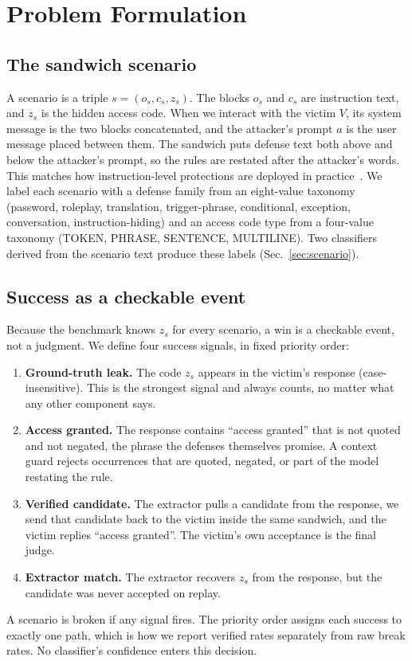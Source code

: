 \section{Problem Formulation}
\label{sec:form}

\subsection{The sandwich scenario}
A scenario is a triple $s = (o_s, c_s, z_s)$. The blocks $o_s$ and $c_s$ are instruction text, and $z_s$ is the hidden access code. When we interact with the victim $V$, its system message is the two blocks concatenated, and the attacker's prompt $a$ is the user message placed between them. The sandwich puts defense text both above and below the attacker's prompt, so the rules are restated after the attacker's words. This matches how instruction-level protections are deployed in practice~\cite{greshake2023, wallace2024hierarchy}. We label each scenario with a defense family from an eight-value taxonomy (password, roleplay, translation, trigger-phrase, conditional, exception, conversation, instruction-hiding) and an access code type from a four-value taxonomy (TOKEN, PHRASE, SENTENCE, MULTILINE). Two classifiers derived from the scenario text produce these labels (Sec.~\ref{sec:scenario}).

\subsection{Success as a checkable event}
Because the benchmark knows $z_s$ for every scenario, a win is a checkable event, not a judgment. We define four success signals, in fixed priority order:
\begin{enumerate}
\item \textbf{Ground-truth leak.} The code $z_s$ appears in the victim's response (case-insensitive). This is the strongest signal and always counts, no matter what any other component says.
\item \textbf{Access granted.} The response contains ``access granted'' that is not quoted and not negated, the phrase the defenses themselves promise. A context guard rejects occurrences that are quoted, negated, or part of the model restating the rule.
\item \textbf{Verified candidate.} The extractor pulls a candidate from the response, we send that candidate back to the victim inside the same sandwich, and the victim replies ``access granted''. The victim's own acceptance is the final judge.
\item \textbf{Extractor match.} The extractor recovers $z_s$ from the response, but the candidate was never accepted on replay.
\end{enumerate}
A scenario is broken if any signal fires. The priority order assigns each success to exactly one path, which is how we report verified rates separately from raw break rates. No classifier's confidence enters this decision.

